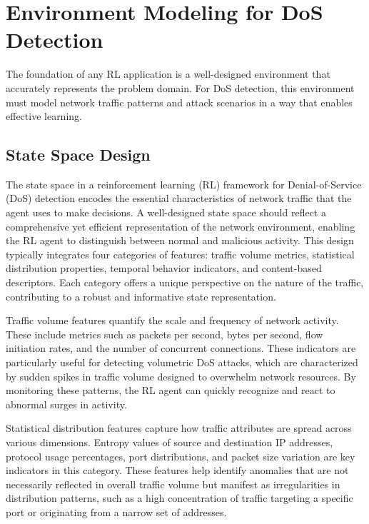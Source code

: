 \documentclass{report}
\begin{document}
\section{Environment Modeling for DoS Detection}

The foundation of any RL application is a well-designed environment that accurately represents the problem domain. For DoS detection, this environment must model network traffic patterns and attack scenarios in a way that enables effective learning.

\subsection{State Space Design}

The state space in a reinforcement learning (RL) framework for Denial-of-Service (DoS) detection encodes the essential characteristics of network traffic that the agent uses to make decisions. A well-designed state space should reflect a comprehensive yet efficient representation of the network environment, enabling the RL agent to distinguish between normal and malicious activity. This design typically integrates four categories of features: traffic volume metrics, statistical distribution properties, temporal behavior indicators, and content-based descriptors. Each category offers a unique perspective on the nature of the traffic, contributing to a robust and informative state representation.

Traffic volume features quantify the scale and frequency of network activity. These include metrics such as packets per second, bytes per second, flow initiation rates, and the number of concurrent connections. These indicators are particularly useful for detecting volumetric DoS attacks, which are characterized by sudden spikes in traffic volume designed to overwhelm network resources. By monitoring these patterns, the RL agent can quickly recognize and react to abnormal surges in activity.

Statistical distribution features capture how traffic attributes are spread across various dimensions. Entropy values of source and destination IP addresses, protocol usage percentages, port distributions, and packet size variation are key indicators in this category. These features help identify anomalies that are not necessarily reflected in overall traffic volume but manifest as irregularities in distribution patterns, such as a high concentration of traffic targeting a specific port or originating from a narrow set of addresses.
\end{document}

